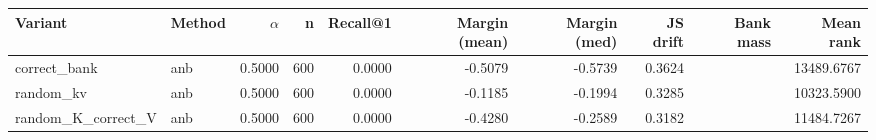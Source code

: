 \begin{tabular}{l l r r r r r r r r}
\toprule
Variant & Method & $\alpha$ & n & Recall@1 & Margin (mean) & Margin (med) & JS drift & Bank mass & Mean rank \\
\midrule
correct\_bank & anb & 0.5000 & 600 & 0.0000 & -0.5079 & -0.5739 & 0.3624 &  & 13489.6767 \\
random\_kv & anb & 0.5000 & 600 & 0.0000 & -0.1185 & -0.1994 & 0.3285 &  & 10323.5900 \\
random\_K\_correct\_V & anb & 0.5000 & 600 & 0.0000 & -0.4280 & -0.2589 & 0.3182 &  & 11484.7267 \\
\bottomrule
\end{tabular}
